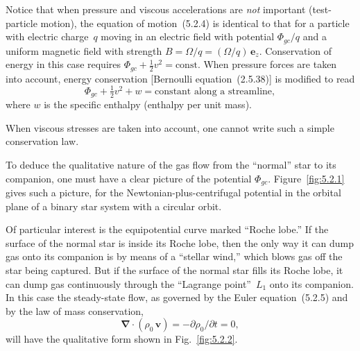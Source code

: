 Notice that when pressure and viscous accelerations are \emph{not} important
(test-particle motion), the equation of motion~(5.2.4) is identical to that
for a particle with electric charge~$q$ moving in an electric field with
potential $\Phi_{gc}/q$ and a uniform magnetic field with strength
$B = \Omega/q = (\Omega/q)\,\mathbf{e}_z$.  Conservation of energy in this
case requires $\Phi_{gc} + \tfrac{1}{2}v^2 = \text{const}$.  When pressure
forces are taken into account, energy conservation [Bernoulli
equation~(2.5.38)] is modified to read
\begin{equation}
\Phi_{gc} + \tfrac{1}{2}v^2 + w
  = \text{constant along a streamline},
\tag{5.2.6}
\end{equation}
where $w$ is the specific enthalpy (enthalpy per unit mass).

When viscous stresses are taken into account, one cannot write such a simple
conservation law.

To deduce the qualitative nature of the gas flow from the ``normal'' star to
its companion, one must have a clear picture of the potential $\Phi_{gc}$.
Figure~\ref{fig:5.2.1} gives such a picture, for the
Newtonian-plus-centrifugal potential in the orbital plane of a binary star
system with a circular orbit.

Of particular interest is the equipotential curve marked ``Roche lobe.''
If the surface of the normal star is inside its Roche lobe, then the only
way it can dump gas onto its companion is by means of a ``stellar wind,''
which blows gas off the star being captured.  But if the surface of the
normal star fills its Roche lobe, it can dump gas continuously through the
``Lagrange point''~$L_1$ onto its companion.  In this case the steady-state
flow, as governed by the Euler equation~(5.2.5) and by the law of mass
conservation,
\begin{equation}
\boldsymbol{\nabla}\cdot(\rho_0\,\mathbf{v})
  = -\partial\rho_0/\partial t = 0,
\tag{5.2.7}
\end{equation}
will have the qualitative form shown in Fig.~\ref{fig:5.2.2}.

